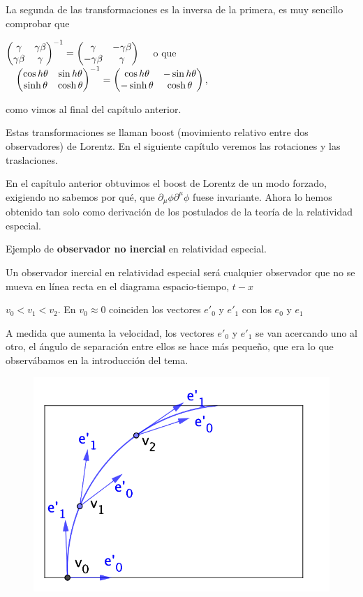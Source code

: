 \color{gris}
La segunda de las transformaciones es la inversa de la primera, es muy sencillo comprobar que 

$\mqty(\gamma & \gamma \beta \\ \gamma \beta & \gamma)^{-1}=\mqty(\gamma & -\gamma \beta \\ -\gamma \beta & \gamma) \quad $ o que $\quad \mqty(\cos h \theta & \sin h \theta \\ \sinh \theta & \cosh \theta)^{-1}=\mqty(\cos h \theta & -\sin h \theta \\ -\sinh \theta & \cosh \theta)$, 

como vimos al final del capítulo anterior.

\color{black}
Estas transformaciones se llaman boost (movimiento relativo entre dos observadores) de Lorentz. \textcolor{gris}{En el siguiente capítulo veremos las rotaciones y las traslaciones.}

En el capítulo anterior obtuvimos el boost de Lorentz de un modo forzado, exigiendo no sabemos por qué, que $\partial_\mu \phi \partial^\mu \phi$ fuese invariante. Ahora lo hemos obtenido tan solo como derivación de los postulados de la teoría de la relatividad especial.


\vspace{5mm}
\begin{example}

Ejemplo de \textbf{observador no inercial} en relatividad especial.	

Un observador inercial en relatividad especial será cualquier observador que no se mueva en línea recta en el diagrama espacio-tiempo, $t-x$
\begin{multicols}{2}
 $v_0<v_1<v_2$. En $v_0\approx 0$ coinciden los vectores $e'_0$ y $e'_1$ con los $e_0$ y $e_1$ 
 
 A medida que aumenta la velocidad, los vectores $e'_0$ y $e'_1$ se van acercando uno al otro, el ángulo de separación entre ellos se hace más pequeño, que era lo que observábamos en la introducción del tema.
\begin{figure}[H]
	\centering
	\includegraphics[width=.4\textwidth]{imagenes/img30-08.png}
\end{figure}	

\end{multicols}

\end{example}





